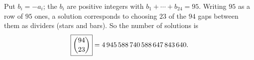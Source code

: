 Put $b_i=-a_i$; the $b_i$ are positive integers with $b_1+\cdots+b_{24}=95$. Writing $95$ as a row of $95$ ones, a solution corresponds to choosing $23$ of the $94$ gaps between them as dividers (stars and bars). So the number of solutions is
\[\boxed{\dbinom{94}{23}}=4\,945\,588\,740\,588\,647\,843\,640.\]
